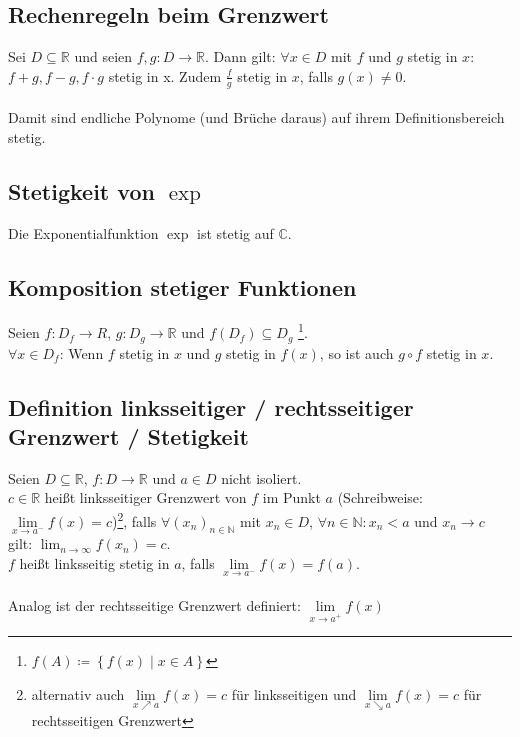 \documentclass[halfparscip]{scrartcl}
\newcounter{subsection2}
\begin{document}
\subsection{Rechenregeln beim Grenzwert}
Sei $D \subseteq \mathbb{R}$ und seien $f, g: D \rightarrow \mathbb{R}$. Dann gilt:
$\forall x \in D$ mit $f$ und $g$ stetig in $x$: $f + g, f-g, f\cdot g$ stetig in x. Zudem $\frac{f}{g}$ stetig in $x$, falls $g(x) \neq 0$.\\\\
Damit sind endliche Polynome (und Brüche daraus) auf ihrem Definitionsbereich stetig.

\subsection{Stetigkeit von $\exp$}
Die Exponentialfunktion $\exp$ ist stetig auf $\mathbb{C}$.

\subsection{Komposition stetiger Funktionen}
Seien $f: D_f \rightarrow R$, $g : D_g \rightarrow \mathbb{R}$ und $f(D_f) \subseteq D_g$ \footnote{$f(A) \coloneqq \left\{f(x) \;\vert\; x \in A\right\}$}.\\
$\forall x \in D_f$: Wenn $f$ stetig in $x$ und $g$ stetig in $f(x)$, so ist auch $g \circ f$ stetig in $x$.

\subsection{Definition linksseitiger / rechtsseitiger Grenzwert / Stetigkeit}
Seien $D \subseteq \mathbb{R}$, $f : D \rightarrow \mathbb{R}$ und $a \in D$ nicht isoliert.\\
$c \in \mathbb{R}$ heißt linksseitiger Grenzwert von $f$ im Punkt $a$ (Schreibweise: $\lim\limits_{x \rightarrow a^-} f(x) = c$)\footnote{alternativ auch $\lim\limits_{x \nearrow a} f(x) = c$ für linksseitigen und $\lim\limits_{x \searrow a} f(x) = c$ für rechtsseitigen Grenzwert}, falls $\forall (x_n)_{n \in \mathbb{N}}$ mit $x_n \in D$, $\forall n \in \mathbb{N}: x_n < a$ und $x_n \rightarrow c$ gilt: $\lim_{n \rightarrow \infty} f(x_n) = c$.\\
$f$ heißt linksseitig stetig in $a$, falls $\lim\limits_{x \rightarrow a^-} f(x) = f(a)$.\\\\
Analog ist der rechtsseitige Grenzwert definiert: $\lim\limits_{x \rightarrow a^+} f(x)$
\end{document}
